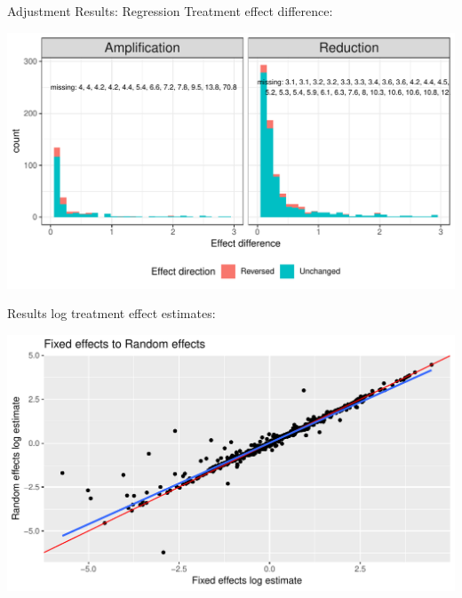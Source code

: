 \documentclass[english]{beamer}\usepackage[]{graphicx}\usepackage[]{color}
\makeatletter
\def\maxwidth{ %
  \ifdim\Gin@nat@width>\linewidth
    \linewidth
  \else
    \Gin@nat@width
  \fi
}
\newenvironment{knitrout}{}{} %
\makeatother
\begin{document}
\begin{frame}[fragile]{Adjustment Results: Regression}
Treatment effect difference:

\vspace{-3mm}
\begin{knitrout}
\color{fgcolor}
\includegraphics[width=\maxwidth]{figure/unnamed-chunk-25-1} 

\end{knitrout}
\end{frame}

\begin{frame}[fragile]{Results}
log treatment effect estimates:

\vspace{-3mm}
\begin{knitrout}
\color{fgcolor}
\includegraphics[width=\maxwidth]{figure/unnamed-chunk-26-1} 

\end{knitrout}
\end{frame}
\end{document}
